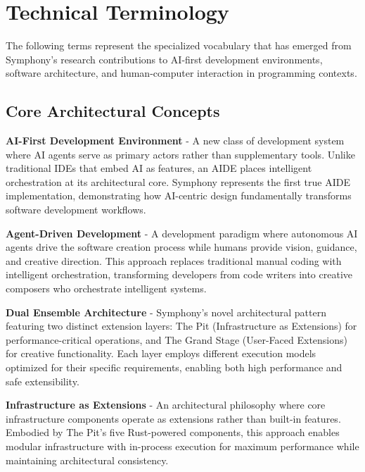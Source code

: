 \section*{Technical Terminology}

The following terms represent the specialized vocabulary that has emerged from Symphony's research contributions to AI-first development environments, software architecture, and human-computer interaction in programming contexts.

\subsection*{Core Architectural Concepts}

\begin{description}[leftmargin=4cm,labelwidth=3.5cm]

\item[\textbf{AIDE}] \textbf{AI-First Development Environment} - A new class of development system where AI agents serve as primary actors rather than supplementary tools. Unlike traditional IDEs that embed AI as features, an AIDE places intelligent orchestration at its architectural core. Symphony represents the first true AIDE implementation, demonstrating how AI-centric design fundamentally transforms software development workflows.

\item[\textbf{ADD}] \textbf{Agent-Driven Development} - A development paradigm where autonomous AI agents drive the software creation process while humans provide vision, guidance, and creative direction. This approach replaces traditional manual coding with intelligent orchestration, transforming developers from code writers into creative composers who orchestrate intelligent systems.

\item[\textbf{DEA}] \textbf{Dual Ensemble Architecture} - Symphony's novel architectural pattern featuring two distinct extension layers: The Pit (Infrastructure as Extensions) for performance-critical operations, and The Grand Stage (User-Faced Extensions) for creative functionality. Each layer employs different execution models optimized for their specific requirements, enabling both high performance and safe extensibility.

\item[\textbf{IaE}] \textbf{Infrastructure as Extensions} - An architectural philosophy where core infrastructure components operate as extensions rather than built-in features. Embodied by The Pit's five Rust-powered components, this approach enables modular infrastructure with in-process execution for maximum performance while maintaining architectural consistency.


\end{description}
